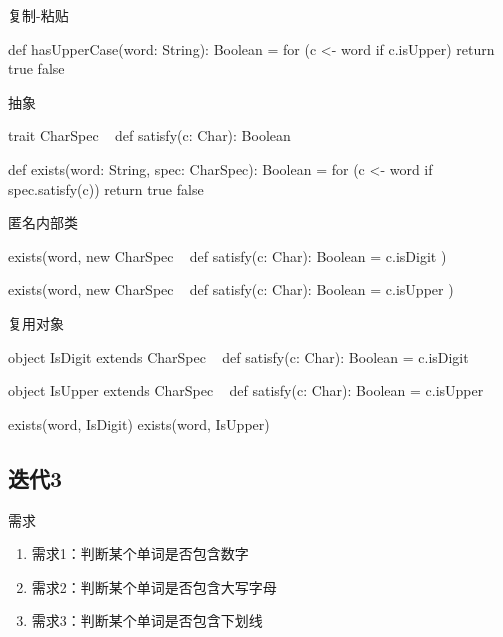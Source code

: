 \begin{frame}[fragile]{复制-粘贴}
  \begin{scala}
def hasUpperCase(word: String): Boolean = {
  for (c <- word if c.isUpper)
    return true
  false
}
  \end{scala}
\end{frame}

\begin{frame}[fragile]{抽象}
  \begin{scala}
trait CharSpec {
  def satisfy(c: Char): Boolean
}

def exists(word: String, spec: CharSpec): Boolean = {
  for (c <- word if spec.satisfy(c))
    return true
  false
}
  \end{scala}
\end{frame}

\begin{frame}[fragile]{匿名内部类}
  \begin{scala}
exists(word, new CharSpec {
  def satisfy(c: Char): Boolean = c.isDigit
})

exists(word, new CharSpec {
  def satisfy(c: Char): Boolean = c.isUpper
})
  \end{scala}
\end{frame}

\begin{frame}[fragile]{复用对象}
  \begin{scala}
object IsDigit extends CharSpec {
  def satisfy(c: Char): Boolean = c.isDigit
}

object IsUpper extends CharSpec {
  def satisfy(c: Char): Boolean = c.isUpper
}

exists(word, IsDigit)
exists(word, IsUpper)
  \end{scala}
\end{frame}

\subsection{迭代3}

\begin{frame}{需求}
  \begin{block}{}
    \begin{enumerate}
    \item \alert{需求1}：判断某个单词是否包含数字
    \item \alert{需求2}：判断某个单词是否包含大写字母
    \item \alert{需求3}：判断某个单词是否包含下划线 
    \end{enumerate}
  \end{block}
\end{frame}

